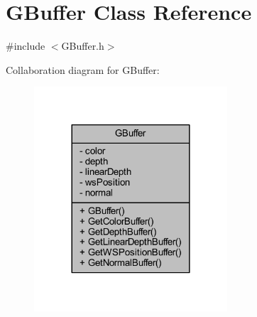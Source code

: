 \hypertarget{class_g_buffer}{}\section{G\+Buffer Class Reference}
\label{class_g_buffer}


{\ttfamily \#include $<$G\+Buffer.\+h$>$}



Collaboration diagram for G\+Buffer\+:\nopagebreak
\begin{figure}[H]
\begin{center}
\leavevmode
\includegraphics[width=204pt]{class_g_buffer__coll__graph}
\end{center}
\end{figure}
